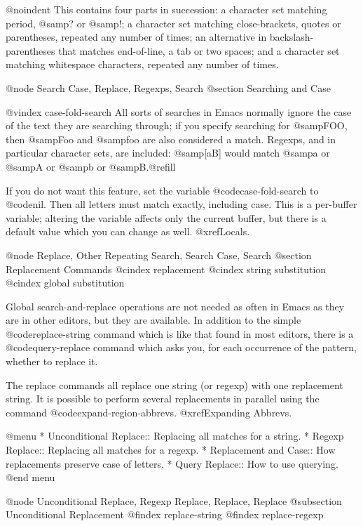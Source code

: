 {{{{{{{{{{{{{{{{{{@noindent
This contains four parts in succession: a character set matching period,
@samp{?} or @samp{!}; a character set matching close-brackets,
quotes or parentheses, repeated any number of times; an alternative in
backslash-parentheses that matches end-of-line, a tab or two spaces; and a
character set matching whitespace characters, repeated any number of times.

@node Search Case, Replace, Regexps, Search
@section Searching and Case

@vindex case-fold-search
  All sorts of searches in Emacs normally ignore the case of the text they
are searching through; if you specify searching for @samp{FOO}, then
@samp{Foo} and @samp{foo} are also considered a match.  Regexps, and in
particular character sets, are included: @samp{[aB]} would match @samp{a}
or @samp{A} or @samp{b} or @samp{B}.@refill

  If you do not want this feature, set the variable @code{case-fold-search}
to @code{nil}.  Then all letters must match exactly, including case.  This
is a per-buffer variable; altering the variable affects only the current
buffer, but there is a default value which you can change as well.
@xref{Locals}.

@node Replace, Other Repeating Search, Search Case, Search
@section Replacement Commands
@cindex replacement
@cindex string substitution
@cindex global substitution

  Global search-and-replace operations are not needed as often in Emacs as
they are in other editors, but they are available.  In addition to the
simple @code{replace-string} command which is like that found in most
editors, there is a @code{query-replace} command which asks you, for each
occurrence of the pattern, whether to replace it.

  The replace commands all replace one string (or regexp) with one
replacement string.  It is possible to perform several replacements in
parallel using the command @code{expand-region-abbrevs}.  @xref{Expanding
Abbrevs}.

@menu
* Unconditional Replace::  Replacing all matches for a string.
* Regexp Replace::         Replacing all matches for a regexp.
* Replacement and Case::   How replacements preserve case of letters.
* Query Replace::          How to use querying.
@end menu

@node Unconditional Replace, Regexp Replace, Replace, Replace
@subsection Unconditional Replacement
@findex replace-string
@findex replace-regexp

}}}}}}}}}}}}}}}}}}
